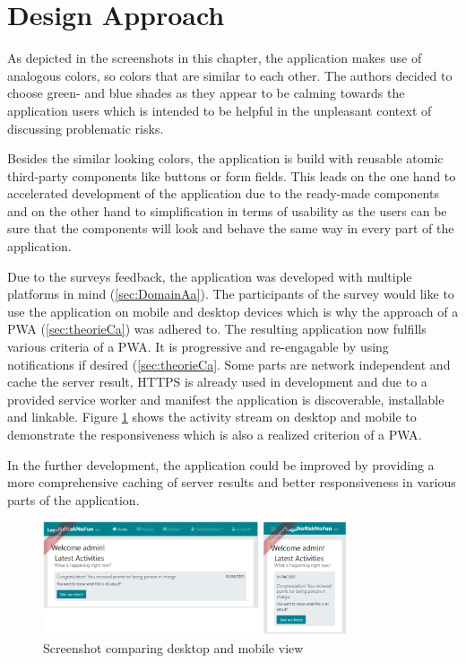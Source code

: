 
\section{Design Approach}
\label{sec:implementationDesign}

As depicted in the screenshots in this chapter, the application makes use of analogous colors, so colors that are similar to each other. The authors decided to choose green- and blue shades as they appear to be calming towards the application users which is intended to be helpful in the unpleasant context of discussing problematic risks.

Besides the similar looking colors, the application is build with reusable atomic third-party components like buttons or form fields. This leads on the one hand to accelerated development of the application due to the ready-made components and on the other hand to simplification in terms of usability as the users can be sure that the components will look and behave the same way in every part of the application.

Due to the surveys feedback, the application was developed with multiple platforms in mind (\ref{sec:DomainAa}). The participants of the survey would like to use the application on mobile and desktop devices which is why the approach of a  \acs{PWA} (\ref{sec:theorieCa}) was adhered to. The resulting application now fulfills various criteria of a PWA. It is progressive and re-engagable by using notifications if desired (\ref{sec:theorieCa}. Some parts are network independent and cache the server result, HTTPS is already used in development and due to a provided service worker and manifest the application is discoverable, installable and linkable. Figure \ref{fig:activitystreamcombined} shows the activity stream on desktop and mobile to demonstrate the responsiveness which is also a realized criterion of a  \acs{PWA}.

In the further development, the application could be improved by providing a more comprehensive caching of server results and better responsiveness in various parts of the application.

\begin{figure}[H]
	\centering
	\includegraphics[width=0.8\textwidth]{Assets/implementation_shots/activitystreamcombined.png}
	\caption{Screenshot comparing desktop and mobile view}
	\label{fig:activitystreamcombined}
\end{figure}